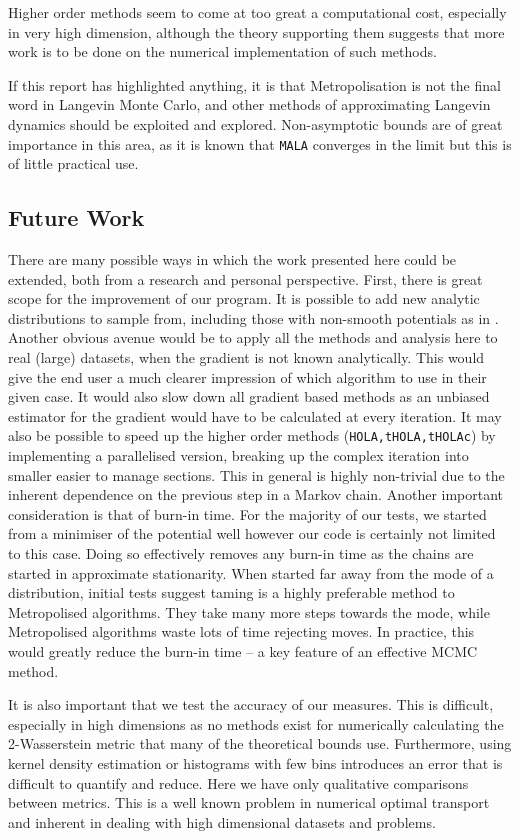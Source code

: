 Higher order methods seem to come at too great a computational cost, especially in very high dimension, although the theory supporting them suggests that more work is to be done on the numerical implementation of such methods.

If this report has highlighted anything, it is that Metropolisation is not the final word in Langevin Monte Carlo, and other methods of approximating Langevin dynamics should be exploited and explored. Non-asymptotic bounds are of great importance in this area, as it is known that \texttt{MALA} converges in the limit but this is of little practical use. 

\subsection{Future Work}\label{subsec:future}
There are many possible ways in which the work presented here could be extended, both from a research and personal perspective. First, there is great scope for the improvement of our program. It is possible to add new analytic distributions to sample from, including those with non-smooth potentials as in \cite{durmus2018efficient}. Another obvious avenue would be to apply all the methods and analysis here to real (large) datasets, when the gradient is not known analytically. This would give the end user a much clearer impression of which algorithm to use in their given case. It would also slow down all gradient based methods as an unbiased estimator for the gradient would have to be calculated at every iteration. It may also be possible to speed up the higher order methods (\texttt{HOLA,tHOLA,tHOLAc}) by implementing a parallelised version, breaking up the complex iteration into smaller easier to manage sections. This in general is highly non-trivial due to the inherent dependence on the previous step in a Markov chain. Another important consideration is that of burn-in time. For the majority of our tests, we started from a minimiser of the potential well however our code is certainly not limited to this case. Doing so effectively removes any burn-in time as the chains are started in approximate stationarity. When started far away from the mode of a distribution, initial tests suggest taming is a highly preferable method to Metropolised algorithms. They take many more steps towards the mode, while Metropolised algorithms waste lots of time rejecting moves. In practice, this would greatly reduce the burn-in time -- a key feature of an effective MCMC method. 

It is also important that we test the accuracy of our measures. This is difficult, especially in high dimensions as no methods exist for numerically calculating the 2-Wasserstein metric that many of the theoretical bounds use. Furthermore, using kernel density estimation or histograms with few bins introduces an error that is difficult to quantify and reduce. Here we have only qualitative comparisons between metrics. This is a well known problem in numerical optimal transport and inherent in dealing with high dimensional datasets and problems.


